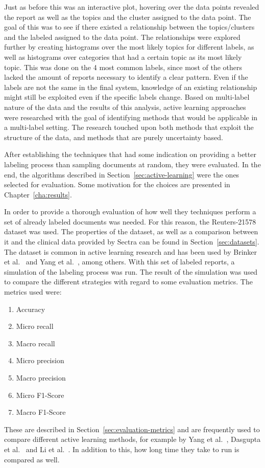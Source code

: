 Just as before this was an interactive plot, hovering over the data points revealed the report as well as the topics and the cluster assigned to the data point.
The goal of this was to see if there existed a relationship between the topics/clusters and the labeled assigned to the data point.
The relationships were explored further by creating histograms over the most likely topics for different labels, as well as histograms over categories that had a certain topic as its most likely topic.
This was done on the 4 most common labels, since most of the others lacked the amount of reports necessary to identify a clear pattern.
Even if the labels are not the same in the final system, knowledge of an existing relationship might still be exploited even if the specific labels change.
Based on multi-label nature of the data and the results of this analysis, active learning approaches were researched with the goal of identifying methods that would be applicable in a multi-label setting.
The research touched upon both methods that exploit the structure of the data, and methods that are purely uncertainty based.

After establishing the techniques that had some indication on providing a better labeling process than sampling documents at random, they were evaluated.
In the end, the algorithms described in Section~\ref{sec:active-learning} were the ones selected for evaluation.
Some motivation for the choices are presented in Chapter~\ref{cha:results}.

In order to provide a thorough evaluation of how well they techniques perform a set of already labeled documents was needed.
For this reason, the Reuters-21578 dataset was used.
The properties of the dataset, as well as a comparison between it and the clinical data provided by Sectra can be found in Section~\ref{sec:datasets}.
The dataset is common in active learning research and has been used by Brinker et al\@.~\cite{brinker2006active} and Yang et al\@.~\cite{yang2009effective}, among others.
With this set of labeled reports, a simulation of the labeling process was run.
The result of the simulation was used to compare the different strategies with regard to some evaluation metrics.
The metrics used were:
\begin{enumerate}
    \item Accuracy
    \item Micro recall
    \item Macro recall
    \item Micro precision
    \item Macro precision
    \item Micro F1-Score
    \item Macro F1-Score
\end{enumerate}
These are described in Section~\ref{sec:evaluation-metrics} and are frequently used to compare different active learning methods, for example by Yang et al\@.~\cite{yang2009effective}, Dasgupta et al\@.~\cite{dasgupta2008hierarchical} and Li et al\@.~\cite{li2013active}.
In addition to this, how long time they take to run is compared as well.

